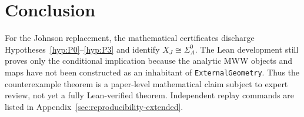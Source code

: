 \section{Conclusion}

For the Johnson replacement, the mathematical certificates discharge
Hypotheses~\ref{hyp:P0}--\ref{hyp:P3} and identify $X_J\cong\Sigma_A^0$.
The Lean development still proves only the conditional implication because
the analytic MWW objects and maps have not been constructed as an inhabitant
of \texttt{ExternalGeometry}.  Thus the counterexample theorem is a
paper-level mathematical claim subject to expert review, not yet a fully
Lean-verified theorem.
Independent replay commands are listed in
Appendix~\ref{sec:reproducibility-extended}.

